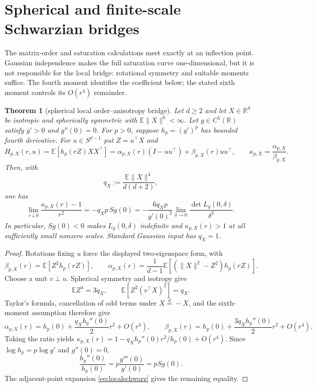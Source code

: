 \documentclass[11pt]{article}
\newtheorem{theorem}{Theorem}[section]
\newcommand{\E}{\mathbb E}
\newcommand{\R}{\mathbb R}
\begin{document}
\section{Spherical and finite-scale Schwarzian bridges}

The matrix-order and saturation calculations meet exactly at an inflection point.  Gaussian independence makes the
full saturation curve one-dimensional, but it is not responsible for the local bridge: rotational symmetry and
suitable moments suffice.  The fourth moment identifies the coefficient below; the stated sixth moment controls
its $O(r^4)$ remainder.

\begin{theorem}[spherical local order--anisotropy bridge]
\label{thm:bridge}
Let $d\ge2$ and let $X\in\R^d$ be isotropic and spherically symmetric with
$\E\lVert X\rVert^6<\infty$.  Let $g\in C^5(\R)$ satisfy $g'>0$ and $g''(0)=0$.
For $p>0$, suppose $h_p=(g')^p$ has bounded fourth derivative.  For $u\in S^{d-1}$ put
$Z=u^\top X$ and
\[
 H_{p,X}(r,u)=\E[h_p(rZ)XX^\top]
 =\alpha_{p,X}(r)(I-uu^\top)+\beta_{p,X}(r)uu^\top ,
 \qquad \kappa_{p,X}=\frac{\alpha_{p,X}}{\beta_{p,X}}.
\]
Then, with
\[
 q_X:=\frac{\E\lVert X\rVert^4}{d(d+2)},
\]
one has
\begin{equation}
 \lim_{r\downarrow0}\frac{\kappa_{p,X}(r)-1}{r^2}
 =-q_Xp\,Sg(0)
 =-\frac{6q_Xp}{g'(0)^2}
   \lim_{\delta\to0}\frac{\det L_g(0,\delta)}{\delta^2}.
 \label{eq:bridge}
\end{equation}
In particular, $Sg(0)<0$ makes $L_g(0,\delta)$ indefinite and
$\kappa_{p,X}(r)>1$ at all sufficiently small nonzero scales.  Standard Gaussian input has $q_X=1$.
\end{theorem}

\begin{proof}
Rotations fixing $u$ force the displayed two-eigenspace form, with
\[
 \beta_{p,X}(r)=\E[Z^2h_p(rZ)],\qquad
 \alpha_{p,X}(r)=\frac1{d-1}
 \E[(\lVert X\rVert^2-Z^2)h_p(rZ)].
\]
Choose a unit $v\perp u$.  Spherical symmetry and isotropy give
\[
 \E Z^4=3q_X,\qquad \E[Z^2(v^\top X)^2]=q_X.
\]
Taylor's formula, cancellation of odd terms under $X\stackrel d=-X$, and the sixth-moment assumption therefore give
\[
 \alpha_{p,X}(r)=h_p(0)+\frac{q_Xh_p''(0)}2r^2+O(r^4),\qquad
 \beta_{p,X}(r)=h_p(0)+\frac{3q_Xh_p''(0)}2r^2+O(r^4).
\]
Taking the ratio yields
$\kappa_{p,X}(r)=1-q_Xh_p''(0)r^2/h_p(0)+O(r^4)$.
Since $\log h_p=p\log g'$ and $g''(0)=0$,
\[
 \frac{h_p''(0)}{h_p(0)}=p\frac{g'''(0)}{g'(0)}=pSg(0).
\]
The adjacent-point expansion \eqref{eq:localschwarz} gives the remaining equality.
\end{proof}
\end{document}
